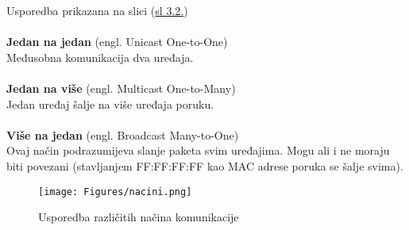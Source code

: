 \documentclass[seminarskirad]{fer}
\begin{document}
Usporedba prikazana na slici (\hyperref[slk:drugaslika]{sl 3.2.})
\\ \\
\textbf{Jedan na jedan} (engl. Unicast One-to-One) \\
Međusobna komunikacija dva uređaja. \\ \\
\textbf{Jedan na više} (engl. Multicast One-to-Many) \\
Jedan uređaj šalje na više uređaja poruku. \\ \\
\textbf{Više na jedan} (engl. Broadcast Many-to-One) \\
Ovaj način podrazumijeva slanje paketa svim uređajima. Mogu ali i ne moraju biti povezani (stavljanjem FF:FF:FF:FF kao MAC adrese poruka se šalje svima).

\begin{figure}[h!]
  \centering
  \texttt{[image: Figures/nacini.png]} 
  \caption{Usporedba različitih načina komunikacije}
  \label{slk:drugaslika}
\end{figure}



\end{document}
